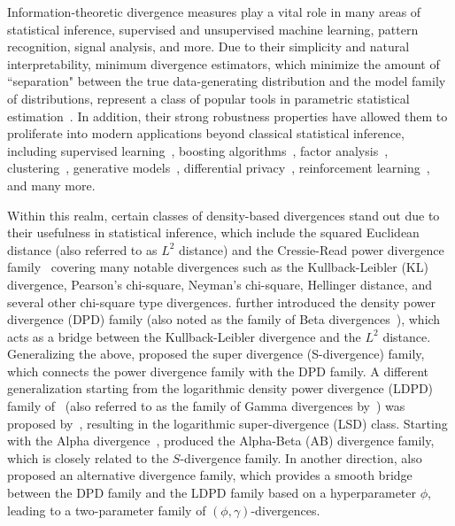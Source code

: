 \documentclass[11pt]{article}
\theoremstyle{plain}
\theoremstyle{remark}
\begin{document}
Information-theoretic divergence measures play a vital role in many areas of statistical inference, supervised and unsupervised machine learning, pattern recognition, signal analysis, and more. Due to their simplicity and natural interpretability, minimum divergence estimators, which minimize the amount of ``separation" between the true data-generating distribution and the model family of distributions, represent a class of popular tools in parametric statistical estimation~\citep{basu2011statistical}. In addition, their strong robustness properties have allowed them to proliferate into modern applications beyond classical statistical inference, including supervised learning~\citep{ghosh2026provably}, boosting algorithms~\citep{takenouchi2004robustifying}, factor analysis~\citep{roy2024robustpca, roy2024robust}, clustering~\citep{chakraborty2023robust}, generative models~\citep{nowozin2016fGAN}, differential privacy~\citep{asoodeh2021local}, reinforcement learning~\citep{li2025choice}, and many more.

Within this realm, certain classes of density-based divergences stand out due to their usefulness in statistical inference, which include the squared Euclidean distance (also referred to as $L^2$ distance) and the Cressie-Read power divergence family~\citep{cressie1984multinomial} covering many notable divergences such as the Kullback-Leibler (KL) divergence, Pearson's chi-square, Neyman's chi-square, Hellinger distance, and several other chi-square type divergences. \cite{basu1998robust} further introduced the density power divergence (DPD) family (also noted as the family of Beta divergences~\citep{cichocki2010families}), which acts as a bridge between the Kullback-Leibler divergence and the $L^2$ distance. Generalizing the above, \cite{ghosh2017generalized} proposed the super divergence (S-divergence) family, which connects the power divergence family with the DPD family. A different generalization starting from the logarithmic density power divergence (LDPD) family of~\cite{jones2001comparison} (also referred to as the family of Gamma divergences by~\cite{fujisawa2008robust}) was proposed by~\cite{maji2014logarithmic}, resulting in the logarithmic super-divergence (LSD) class. Starting with the Alpha divergence~\citep{chernoff1952measure}, \cite{cichocki2011generalized} produced the Alpha-Beta (AB) divergence family, which is closely related to the $S$-divergence family. In another direction, \cite{jones2001comparison} also proposed an alternative divergence family, which provides a smooth bridge between the DPD family and the LDPD family based on a hyperparameter $\phi$, leading to a two-parameter family of $(\phi,\gamma)$-divergences.
\end{document}
